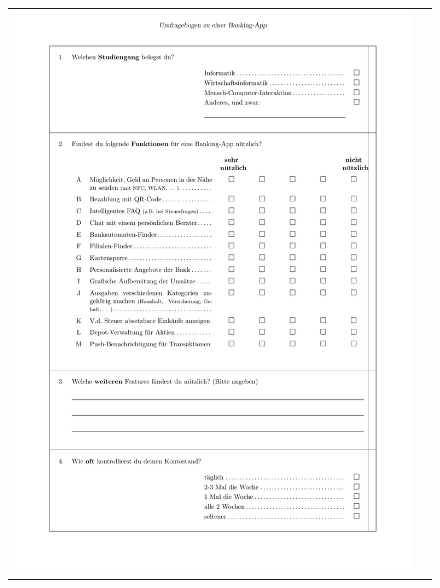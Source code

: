 \begin{figure}
	\centering
	\begin{tabular}{@{}cc@{}}
		\includegraphics[page=1, scale=.3]{Pictures/Questionnaire} &

\end{tabular}
\end{figure}
